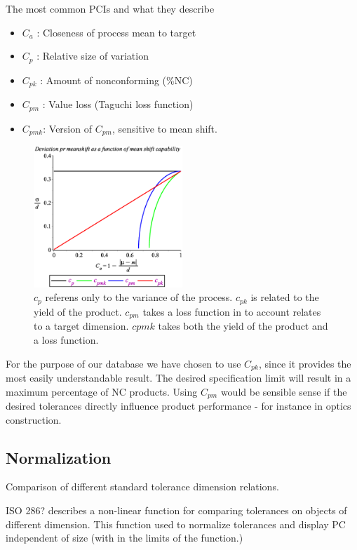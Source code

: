\documentclass[aip,amsmath, reprint, author-year]{revtex4-1}
\begin{document}
The most common PCIs and what they describe \citep{wu2009overview, taguchi1986introduction}
\begin{itemize}
	\item $C_a$ : Closeness of process mean to target 
	\item $C_p$ : Relative size of variation
	\item $C_{pk}$ : Amount of nonconforming (\%NC)
	\item $C_{pm}$ : Value loss (Taguchi loss function)
	\item $C_{pmk}$: Version of $C_{pm}$,  sensitive to mean shift. 
\end{itemize}

\begin{figure}
\includegraphics[width=0.5\textwidth]{graph_postscript_test.eps}
\caption{\label{fig:cpk} $c_p$ referens only to the variance of the process. $c_{pk}$ is related to the yield of the product. $c_{pm}$ takes a loss function in to account relates to a target dimension. $cpmk$ takes both the yield of the product and a loss function. }
\end{figure}

For the purpose of our database we have chosen to use $C_{pk}$, since it provides the most easily understandable result. The desired specification limit will result in a maximum percentage of NC products. Using $C_{pm}$ would be sensible sense if the desired tolerances directly influence product performance - for instance in optics construction.  


\subsection{Normalization}

Comparison of different standard tolerance dimension relations. 

ISO 286? describes a non-linear function for comparing tolerances on objects of different dimension. This function used to normalize tolerances and display PC independent of size (with in the limits of the function.)  
\end{document}
